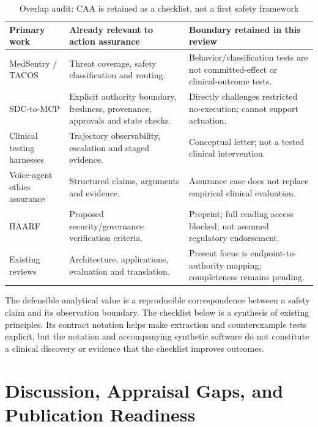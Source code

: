 \documentclass[journal,10pt]{IEEEtran}
\begin{document}
\begin{table}[t]\caption{Overlap audit: CAA is retained as a checklist, not a first safety framework}\label{tab:overlap}\centering\footnotesize
\begin{tabularx}{\textwidth}{@{}p{}p{}Y@{}}\toprule
Primary work & Already relevant to action assurance & Boundary retained in this review \\\midrule
MedSentry / TACOS \cite{medsentry,tacos} & Threat coverage, safety classification and routing. & Behavior/classification tests are not committed-effect or clinical-outcome tests.\\
SDC-to-MCP \cite{sdcgateway} & Explicit authority boundary, freshness, provenance, approvals and state checks. & Directly challenges restricted no-execution; cannot support actuation.\\
Clinical testing harnesses \cite{clinicalharness} & Trajectory observability, escalation and staged evidence. & Conceptual letter; not a tested clinical intervention.\\
Voice-agent ethics assurance \cite{voiceassurance} & Structured claims, arguments and evidence. & Assurance case does not replace empirical clinical evaluation.\\
HAARF \cite{haarf} & Proposed security/governance verification criteria. & Preprint; full reading access blocked; not assumed regulatory endorsement.\\
Existing reviews \cite{collaco2026review,xu2026survey,hu2026survey,broadscoping} & Architecture, applications, evaluation and translation. & Present focus is endpoint-to-authority mapping; completeness remains pending.\\\bottomrule
\end{tabularx}\end{table}

The defensible analytical value is a reproducible correspondence between a safety claim and its observation boundary. The checklist below is a synthesis of existing principles. Its contract notation helps make extraction and counterexample tests explicit, but the notation and accompanying synthetic software do not constitute a clinical discovery or evidence that the checklist improves outcomes.





\section{Discussion, Appraisal Gaps, and Publication Readiness}
\end{document}
